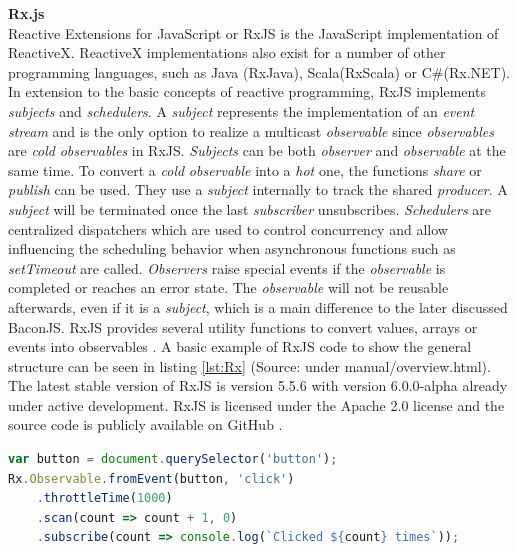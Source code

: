 	\noindent\textbf{Rx.js}\\
	Reactive Extensions for JavaScript or RxJS \cite{RxJS} is the JavaScript implementation of ReactiveX. ReactiveX implementations also exist for a number of other programming languages, such as Java (RxJava), Scala(RxScala) or C\#(Rx.NET). In extension to the basic concepts of reactive programming, RxJS implements \emph{subjects} and \emph{schedulers}. A \emph{subject} represents the implementation of an \emph{event stream} and is the only option to realize a multicast \emph{observable} since \emph{observables} are \emph{cold} \emph{observables} in RxJS. \emph{Subjects} can be both \emph{observer} and \emph{observable} at the same time. To convert a \emph{cold} \emph{observable} into a \emph{hot} one, the functions \emph{share} or \emph{publish} can be used. They use a \emph{subject} internally to track the shared \emph{producer}. A \emph{subject} will be terminated once the last \emph{subscriber} unsubscribes. \emph{Schedulers} are centralized dispatchers which are used to control concurrency and allow influencing the scheduling behavior when asynchronous functions such as \emph{setTimeout}\cite{RxJsDocu} are called. \emph{Observers} raise special events if the \emph{observable} is completed or reaches an error state. The \emph{observable} will not be reusable afterwards, even if it is a \emph{subject}, which is a main difference to the later discussed BaconJS. RxJS provides several utility functions to convert values, arrays or events into observables \cite{ThesisBaradur}. A basic example of RxJS code to show the general structure can be seen in listing \ref{lst:Rx} (Source: \cite{RxJsDocu} under manual/overview.html).
	The latest stable version of RxJS is version 5.5.6 with version 6.0.0-alpha already under active development. RxJS is licensed under the Apache 2.0 license and the source code is publicly available on GitHub \cite{RxJSRepo}.\\

\begin{lstlisting}[language=JavaScript, caption={Example of RxJS code.},label={lst:Rx}]
var button = document.querySelector('button');
Rx.Observable.fromEvent(button, 'click')
	.throttleTime(1000)
	.scan(count => count + 1, 0)
	.subscribe(count => console.log(`Clicked ${count} times`));
\end{lstlisting}
	
